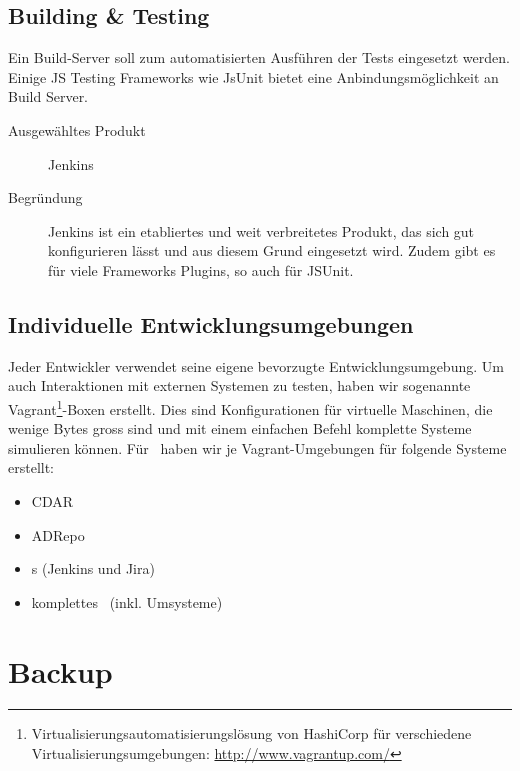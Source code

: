 


		\subsection{Building \& Testing}
			Ein Build-Server soll zum automatisierten Ausführen der Tests eingesetzt werden.
			Einige JS Testing Frameworks wie JsUnit bietet eine Anbindungsmöglichkeit an Build Server.
			
			\begin{description}
				\item[Ausgewähltes Produkt] Jenkins
				\item[Begründung] Jenkins ist ein etabliertes und weit verbreitetes Produkt, 
					das sich gut konfigurieren lässt und aus diesem Grund eingesetzt wird.
					Zudem gibt es für viele Frameworks Plugins, so auch für JSUnit.
			\end{description}
							
				

		\subsection{Individuelle Entwicklungsumgebungen}
			Jeder Entwickler verwendet seine eigene bevorzugte Entwicklungsumgebung.
			Um auch Interaktionen mit externen Systemen zu testen,
			haben wir sogenannte Vagrant\footnote{Virtualisierungsautomatisierungslösung von HashiCorp für verschiedene Virtualisierungsumgebungen: \url{http://www.vagrantup.com/}}-Boxen erstellt.
			Dies sind Konfigurationen für virtuelle Maschinen, die wenige Bytes gross sind
			und mit einem einfachen Befehl komplette Systeme simulieren können.
			Für \eeppi\ haben wir je Vagrant-Umgebungen für folgende Systeme erstellt:
			\begin{itemize}
				\item{CDAR}
				\item{ADRepo}
				\item{\ppt s (Jenkins und Jira)}
				\item{komplettes \eeppi\ (inkl. Umsysteme)}
			\end{itemize}


	\section{Backup}
